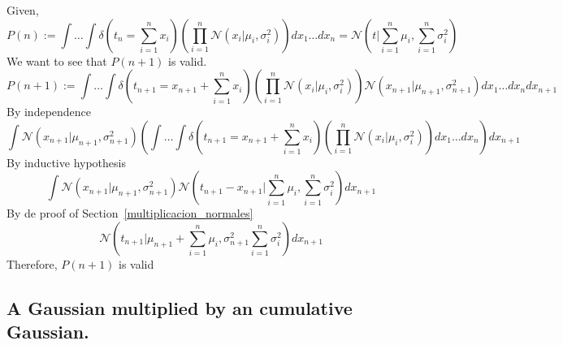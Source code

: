 \documentclass[article]{jss}
\newcommand{\N}{\mathcal{N}}
\begin{document}
Given,
\begin{equation}
 P(n) :=\int \dots \int \delta(t_n= \sum_{i=1}^n x_i ) \left( \prod_{i=1}^n \N(x_i|\mu_i,\sigma_i^2) \right) dx_1 \dots dx_n = \N(t|\sum_{i=1}^n \mu_i,\sum_{i=1}^n \sigma_i^2 )
\end{equation}
%
We want to see that $P(n+1)$ is valid. 
%
\begin{equation}
 P(n+1) := \int \dots \int \delta(t_{n+1}=x_{n+1} + \sum_{i=1}^{n} x_i ) \left( \prod_{i=1}^{n} \N(x_i|\mu_i,\sigma_i^2) \right) \N(x_{n+1}|\mu_{n+1},\sigma_{n+1}^2) dx_1 \dots dx_{n} dx_{n+1}
\end{equation}
%
By independence
\begin{equation}
 \int \N(x_{n+1}|\mu_{n+1},\sigma_{n+1}^2) \left( \int \dots \int \delta(t_{n+1}= x_{n+1} + \sum_{i=1}^{n} x_i ) \left( \prod_{i=1}^{n} \N(x_i|\mu_i,\sigma_i^2) \right)  dx_1 \dots dx_{n}\right) dx_{n+1}
\end{equation}
%
By inductive hypothesis
\begin{equation}
 \int \N(x_{n+1}|\mu_{n+1},\sigma_{n+1}^2) \N(t_{n+1}-x_{n+1}|\sum_{i=1}^n \mu_i,\sum_{i=1}^n \sigma_i^2) dx_{n+1}
\end{equation}
%
By de proof of Section~\ref{multiplicacion_normales}
\begin{equation}
  \N(t_{n+1}|\mu_{n+1}+\sum_{i=1}^{n} \mu_i,\sigma_{n+1}^2 \sum_{i=1}^n \sigma_i^2) dx_{n+1}
\end{equation}
%
Therefore, $P(n+1)$ is valid

\subsection{A Gaussian multiplied by an cumulative Gaussian.}
\end{document}
